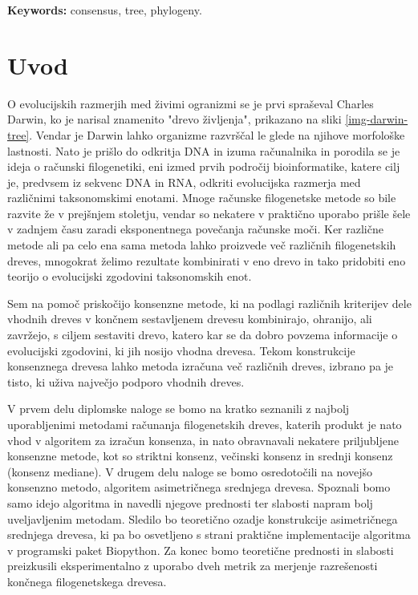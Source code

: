 \documentclass[a4paper, 12pt]{book}
\newcommand{\tkeywordsEn}{consensus, tree, phylogeny}
\newcommand{\clearemptydoublepage}{\newpage{\pagestyle{empty}\cleardoublepage}}
\begin{document}
\noindent\textbf{Keywords:} \tkeywordsEn.
\clearemptydoublepage

\mainmatter
\setcounter{page}{1}
\pagestyle{fancy}

\chapter{Uvod}
O evolucijskih razmerjih med živimi ogranizmi se je prvi spraševal Charles Darwin, ko je narisal znamenito "drevo življenja", prikazano na sliki \ref{img-darwin-tree}. Vendar je Darwin lahko organizme razvrščal le glede na njihove morfološke lastnosti. Nato je prišlo do odkritja DNA in izuma računalnika in porodila se je ideja o računski filogenetiki, eni izmed prvih področij bioinformatike, katere cilj je, predvsem iz sekvenc DNA in RNA, odkriti evolucijska razmerja med različnimi taksonomskimi enotami.  Mnoge računske filogenetske metode so bile razvite že v prejšnjem stoletju, vendar so nekatere v praktično uporabo prišle šele v zadnjem času zaradi eksponentnega povečanja računske moči. Ker različne metode ali pa celo ena sama metoda lahko proizvede več različnih filogenetskih dreves, mnogokrat želimo rezultate kombinirati v eno drevo in tako pridobiti eno teorijo o evolucijski zgodovini taksonomskih enot. 

Sem na pomoč priskočijo konsenzne metode, ki na podlagi različnih  kriterijev dele vhodnih dreves v končnem sestavljenem drevesu kombinirajo, ohranijo, ali zavržejo, s ciljem sestaviti drevo, katero kar se da dobro povzema informacije o evolucijski zgodovini, ki jih nosijo vhodna drevesa. Tekom konstrukcije konsenznega drevesa lahko metoda izračuna več različnih dreves, izbrano pa je tisto, ki uživa največjo podporo vhodnih dreves.

V prvem delu diplomske naloge se bomo na kratko seznanili z najbolj uporabljenimi metodami računanja filogenetskih dreves, katerih produkt je nato vhod v algoritem za izračun konsenza, in nato obravnavali nekatere priljubljene konsenzne metode, kot so striktni konsenz, večinski konsenz in srednji konsenz (konsenz mediane). V drugem delu naloge se bomo osredotočili na novejšo konsenzno metodo, algoritem asimetričnega srednjega drevesa. Spoznali bomo samo idejo algoritma in navedli njegove prednosti ter slabosti napram bolj uveljavljenim metodam. Sledilo bo teoretično ozadje konstrukcije asimetričnega srednjega drevesa, ki pa bo osvetljeno s strani praktične implementacije algoritma v programski paket Biopython. Za konec bomo teoretične prednosti in slabosti preizkusili eksperimentalno z uporabo dveh metrik za merjenje razrešenosti končnega filogenetskega drevesa.
\end{document}
